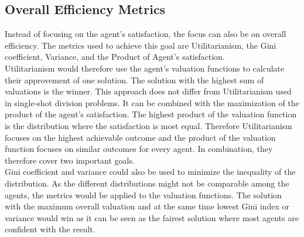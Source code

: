 \documentclass[german, a4paper, 11pt, oneside]{scrbook}
\begin{document}
\subsection{Overall Efficiency Metrics}
Instead of focusing on the agent's satisfaction, the focus can also be on overall efficiency. The metrics used to achieve this goal are Utilitarianism, the Gini coefficient, Variance, and the Product of Agent's satisfaction. \\Utilitarianism would therefore use the agent's valuation functions to calculate their approvement of one solution. The solution with the highest sum of valuations is the winner. This approach does not differ from Utilitarianism used in single-shot division problems. It can be combined with the maximization of the product of the agent's satisfaction. The highest product of the valuation function is the distribution where the satisfaction is most equal. Therefore Utilitarianism focuses on the highest achievable outcome and the product of the valuation function focuses on similar outcomes for every agent. In combination, they therefore cover two important goals.
\\Gini coefficient and variance could also be used to minimize the inequality of the distribution. As the different distributions might not be comparable among the agents, the metrics would be applied to the valuation functions. The solution with the maximum overall valuation and at the same time lowest Gini index or variance would win as it can be seen as the fairest solution where most agents are confident with the result.
\end{document}
